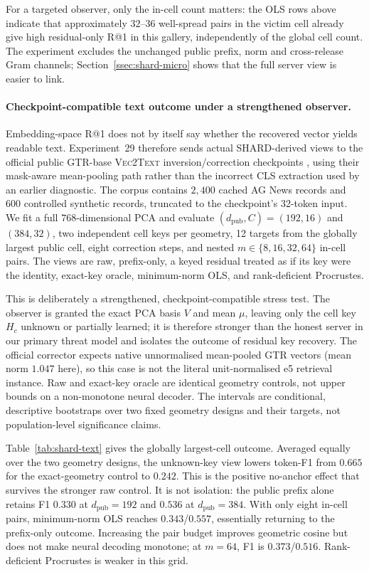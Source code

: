 For a targeted observer, only the in-cell count matters: the OLS rows above
indicate that approximately $32$--$36$ well-spread pairs in the victim cell
already give high residual-only R@1 in this gallery, independently of the
global cell count. The experiment excludes the unchanged public prefix, norm
and cross-release Gram channels; Section~\ref{ssec:shard-micro} shows that the
full server view is easier to link.

\paragraph{Checkpoint-compatible text outcome under a strengthened observer.}
\label{ssec:shard-text}
Embedding-space R@1 does not by itself say whether the recovered vector yields
readable text. Experiment~29 therefore sends actual SHARD-derived views to the
official public GTR-base \textsc{Vec2Text} inversion/correction checkpoints
\cite{ref_gtr,ref_vec2text}, using their mask-aware mean-pooling path rather
than the incorrect CLS extraction used by an earlier diagnostic. The corpus
contains $2{,}400$ cached AG News records and $600$ controlled synthetic
records, truncated to the checkpoint's 32-token input. We fit a full
$768$-dimensional PCA and evaluate $(d_{\mathrm{pub}},C)=(192,16)$ and
$(384,32)$, two independent cell keys per geometry, 12 targets from the
globally largest public cell, eight correction steps, and nested
$m\in\{8,16,32,64\}$ in-cell pairs. The views are raw, prefix-only, a keyed
residual treated as if its key were the identity, exact-key oracle,
minimum-norm OLS, and rank-deficient Procrustes.

This is deliberately a strengthened, checkpoint-compatible stress test. The
observer is granted the exact PCA basis $V$ and mean $\mu$, leaving only the
cell key $H_c$ unknown or partially learned; it is therefore stronger than the
honest server in our primary threat model and isolates the outcome of residual
key recovery. The official corrector expects native unnormalised mean-pooled
GTR vectors (mean norm $1.047$ here), so this case is not the literal
unit-normalised e5 retrieval instance. Raw and exact-key oracle are identical
geometry controls, not upper bounds on a non-monotone neural decoder. The
intervals are conditional, descriptive bootstraps over two fixed geometry
designs and their targets, not population-level significance claims.

Table~\ref{tab:shard-text} gives the globally largest-cell outcome. Averaged
equally over the two geometry designs, the unknown-key view lowers token-F1
from $0.665$ for the exact-geometry control to $0.242$. This is the positive
no-anchor effect that survives the stronger raw control. It is not isolation:
the public prefix alone retains F1 $0.330$ at $d_{\mathrm{pub}}=192$ and
$0.536$ at $d_{\mathrm{pub}}=384$. With only eight in-cell pairs,
minimum-norm OLS reaches $0.343$/$0.557$, essentially returning to the
prefix-only outcome. Increasing the pair budget improves geometric cosine but
does not make neural decoding monotone; at $m=64$, F1 is
$0.373$/$0.516$. Rank-deficient Procrustes is weaker in this grid.

